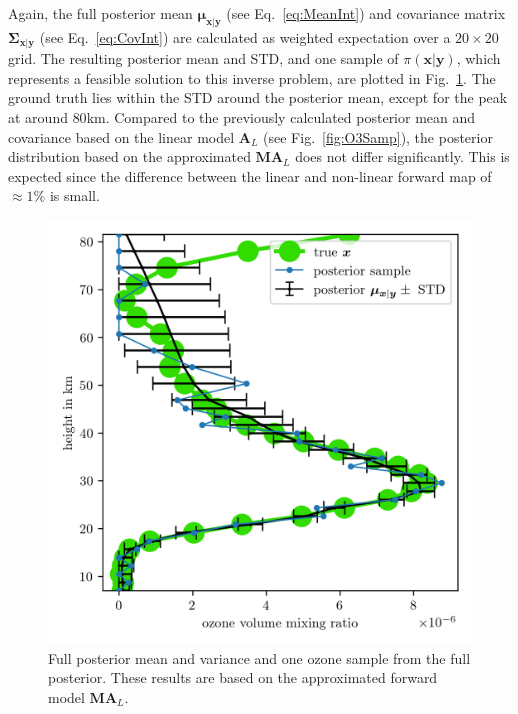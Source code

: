 Again, the full posterior mean $\bm{\mu}_{\bm{x}|\bm{y}}$ (see Eq.~\ref{eq:MeanInt}) and covariance matrix $\bm{\Sigma}_{ \bm{x}|\bm{y}}$ (see Eq.~\ref{eq:CovInt}) are calculated as weighted expectation over a $20\times 20$ grid.
The resulting posterior mean and STD, and one sample of $\pi(\bm{x}|\bm{y})$, which represents a feasible solution to this inverse problem, are plotted in Fig.~\ref{fig:O3SolplsReg}.
The ground truth lies within the STD around the posterior mean, except for the peak at around $80$km.
Compared to the previously calculated posterior mean and covariance based on the linear model $\bm{A}_L$ (see Fig.~\ref{fig:O3Samp}), the posterior distribution based on the approximated $\bm{M A}_L$ does not differ significantly.
This is expected since the difference between the linear and non-linear forward map of $\approx 1 \%$ is small.
\begin{figure}[ht!]
	\centering
	\includegraphics{SecRecResinclRegandSampl.png}
	\caption[Full posterior mean and variance of ozone and the regularised solution compared to the ground truth.]{Full posterior mean and variance and one ozone sample from the full posterior. These results are based on the approximated forward model $\bm{M}\bm{A}_L$.}
	\label{fig:O3SolplsReg}
\end{figure} 


